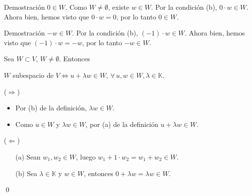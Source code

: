 \documentclass[handout]{beamer} %
\newcommand{\K}{\mathbb K}
\begin{document}
        \begin{frame}

        \begin{block}{Demostración $0 \in W$.}\pause
            Como $W \ne \emptyset$, existe $w \in W$. Por la condición (b), $0\cdot w \in W$. Ahora bien,  hemos visto que $0\cdot w =0$, por lo tanto $0 \in W$.
        \end{block}
        \pause
        \begin{block}{Demostración $-w \in W$.}\pause
           Por la condición (b), $(-1)\cdot w \in W$. Ahora bien,  hemos visto que $(-1)\cdot w =-w$, por lo tanto $-w \in W$.
        \end{block}
        \vskip 2cm
      
    
        \end{frame}

        \begin{frame}
            \begin{observacion}
                Sea $W \subset V$,   $W \ne \emptyset$. Entonces
                \begin{center}
                    $W$ subespacio de $V$\quad $\Leftrightarrow$\quad  $u + \lambda w \in W$,\;  $\forall\,u,w \in W,\lambda \in \K$.
                \end{center}
           \end{observacion}
           \pause
           \begin{demostracion}\pause

            ($\Rightarrow$) \pause
            \begin{itemize}
                \item  Por (b) de la definición, $\lambda w \in W$.
                \item  Como $u \in W$ y  $\lambda w \in W$, por (a)  de la definición  $u + \lambda w \in W$.
            \end{itemize}
            \pause

            ($\Leftarrow$) \pause
            
            \begin{itemize}
                \item[(a)] Sean $w_1 , w_2 \in W$, luego $w_1 + 1 \cdot w_2 = w_1 +w_2 \in W$.
                \item[(b)] Sea $\lambda \in \K$ y $w \in W$, entonces $0 + \lambda w = \lambda w \in W$.
            \end{itemize}
            \qed
           

           

           \end{demostracion}
        \end{frame}
\end{document}

